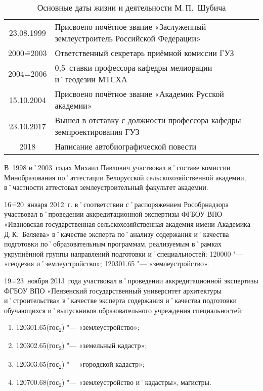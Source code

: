 \begin{table}[t]
{\begin{tabularx}{\textwidth}{cX}
		23.08.1999	&	Присвоено почётное звание «Заслуженный землеустроитель Российской Федерации»		\\
		2000\==2003		&	Ответственный секретарь приёмной комиссии ГУЗ										\\
		2004\==2006		&	0,5~ставки профессора кафедры мелиорации и˚геодезии МТСХА							\\
		15.10.2004	&	Присвоено почётное звание «Академик Русской академии»									\\
		23.10.2017	&	Вышел в отставку с должности профессора кафедры земпроектирования ГУЗ									\\
		2018				&	Написание автобиографической повести									\\
	\end{tabularx}
}
\caption{Основные даты жизни и деятельности М.\,П.~Шубича}
\label{tab:biograf}  
\end{table}

\FloatBarrier

В~1998 и˚2003~годах Михаил Павлович участвовал в˚составе комиссии Минобразования по˚аттестации Белорусской сельскохозяйственной академии, в˚частности аттестовал землеустроительный факультет академии. 

16\==20~января 2012~г. в˚соответствии с˚распоряжением Рособрнадзора участвовал в˚проведении аккредитационной экспертизы ФГБОУ ВПО «Ивановская государственная сельскохозяйственная академия имени Академика Д.\,К.~Беляева» в˚качестве эксперта по˚анализу содержания и˚качества подготовки по˚образовательным программам, реализуемым в˚рамках укрупнённой группы направлений подготовки и˚специальностей: 120000 "--- «геодезия и˚землеустройство»; 120301.65 "--- «землеустройство».

19\==23~ноября 2013~года участвовал в˚проведении аккредитационной экспертизы ФГБОУ ВПО «Пензенский государственный университет архитектуры и˚строительства» в˚качестве эксперта содержания и˚качества подготовки обучающихся и˚выпускников образовательного учреждения специальностей:

\begin{enumerate}
	\item 120301.65(гос\textsubscript{2}) "--- «землеустройство»; 
	\item 120302.65(гос\textsubscript{2}) "--- «земельный кадастр»; 
	\item 120303.65(гос\textsubscript{2}) "--- «городской кадастр»; 
 	\item 120700.68(гос\textsubscript{2}) "--- «землеустройство и˚кадастры», магистры.
\end{enumerate}


